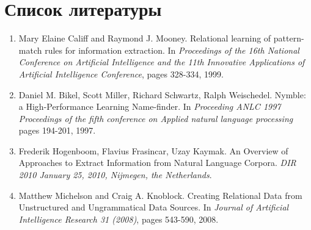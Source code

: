 \chapter*{Список литературы}

\begin{enumerate}
	\item Mary Elaine Califf and Raymond J. Mooney. Relational learning of pattern-match rules for information extraction. In \textit{Proceedings of the 16th National Conference on Artificial Intelligence and the 11th Innovative Applications of Artificial Intelligence Conference}, pages 328-334, 1999.
	\item Daniel M. Bikel, Scott Miller, Richard Schwartz, Ralph Weischedel. Nymble: a High-Performance Learning Name-finder. In \textit{Proceeding ANLC 1997 Proceedings of the fifth conference on Applied natural language processing} pages 194-201, 1997.
	\item Frederik Hogenboom, Flavius Frasincar, Uzay Kaymak. An Overview of Approaches to Extract Information from Natural Language Corpora. \textit{DIR 2010 January 25, 2010, Nijmegen, the Netherlands}.
	\item Matthew Michelson and Craig A. Knoblock. Creating Relational Data from Unstructured and Ungrammatical Data Sources. In \textit{Journal of Artificial Intelligence Research 31 (2008)}, pages 543-590, 2008.
\end{enumerate}